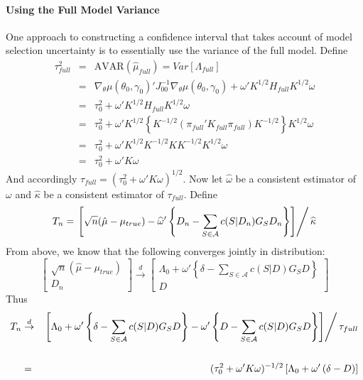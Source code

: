 \documentclass[12pt]{article}
\theoremstyle{definition}
\newcommand{\slfrac}[2]{\left.#1\right/#2}
\begin{document}
\paragraph{Using the Full Model Variance} One approach to constructing a confidence interval that takes account of model selection uncertainty is to essentially use the variance of the full model. Define
	\begin{eqnarray*}
		\tau_{full}^2 &=& \mbox{AVAR}(\hat{\mu}_{full})= Var[\Lambda_{full}]\\
			&=&  \nabla_{\theta}\mu(\theta_0,\gamma_0)'J_{00}^{-1}\nabla_{\theta}\mu(\theta_0,\gamma_0) + \omega'K^{1/2}H_{full} K^{1/2}\omega\\
			&=& \tau_0^2 + \omega'K^{1/2}H_{full} K^{1/2}\omega\\
			&=& \tau_0^2 + \omega'K^{1/2}\left\{ K^{-1/2}(\pi_{full}' K_{full} \pi_{full})  K^{-1/2}  \right\} K^{1/2}\omega\\
			&=& \tau_0^2 + \omega'K^{1/2} K^{-1/2} K K^{-1/2} K^{1/2}\omega\\
			&=& \tau_0^2 + \omega' K \omega
\end{eqnarray*}
And accordingly $\tau_{full} = (\tau_0^2 + \omega' K \omega)^{1/2}$. Now let $\hat{\omega}$ be a consistent estimator of $\omega$ and $\widehat{\kappa}$ be a consistent estimator of $\tau_{full}$. Define
	$$T_n =\slfrac{\left[\sqrt{n}(\hat{\mu} - \mu_{true})  - \widehat{\omega}'\left\{D_n -  \sum_{S\in \mathcal{A}} c(S|D_n)G_S D_n \right\} \right]}{\widehat{\kappa}}$$
 From above, we know that the following converges jointly in distribution:
	$$
	\left[\begin{array}{c}
		\sqrt{n}(\hat{\mu} - \mu_{true})\\
		D_n
\end{array}\right] \overset{d}{\rightarrow}
		\left[\begin{array}{c}
		\Lambda_0 + \omega' \left\{ \delta - \sum_{S \in \mathcal{A}}  c(S|D)G_S D \right\}\\
		D
\end{array}\right] 	
$$
Thus
	\begin{eqnarray*}	
T_n &\overset{d}{\rightarrow}& \slfrac{\left[\Lambda_0 + \omega' \left\{ \delta - \sum_{S \in \mathcal{A}}  c(S|D)G_S D \right\}  - \omega'\left\{D -  \sum_{S\in \mathcal{A}} c(S|D)G_S D \right\} \right]}{\tau_{full}}\\ \\
		&=& (\tau_0^2 + \omega' K \omega)^{-1/2}\left[\Lambda_0 + \omega'\left( \delta - D\right)\right] 
\end{eqnarray*}
\end{document}
